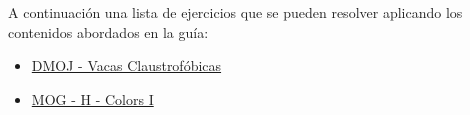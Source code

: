 A continuación una lista de ejercicios que se pueden resolver aplicando los contenidos abordados en la guía:

\begin{itemize}
	\item \href{https://dmoj.uclv.edu.cu/problem/claust}{DMOJ - Vacas Claustrofóbicas}
	\item \href{https://matcomgrader.com/problem/9597/colors-i/}{MOG - H - Colors I}
\end{itemize}